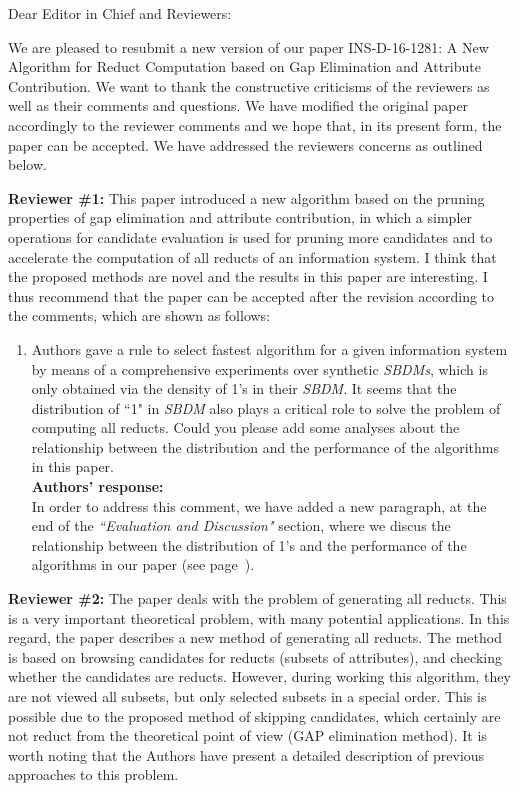 \documentclass{letter}
\begin{document}
\begin{letter}{}
  \opening{Dear Editor in Chief and Reviewers:}

  We are pleased to resubmit a new version of our paper INS-D-16-1281: A New Algorithm for Reduct Computation based on Gap Elimination and Attribute Contribution. We want to thank the constructive criticisms of the reviewers as well as their comments and questions. We have modified the original paper accordingly to the reviewer comments and we hope that, in its present form, the paper can be accepted. We have addressed the reviewers concerns as outlined below.

  \textbf{Reviewer \#1:} 
  This paper introduced a new algorithm based on the pruning properties of gap elimination and attribute contribution, in which a simpler operations for candidate evaluation is used for pruning more candidates and to accelerate the computation of all reducts of an information system. I think that the proposed methods are novel and the results in this paper are interesting. I thus recommend that the paper can be accepted after the revision according to the comments, which are shown as follows:

  \begin{enumerate}
    \item Authors gave a rule to select fastest algorithm for a given information system by means of a comprehensive experiments over synthetic \textit{SBDMs}, which is only obtained via the density of 1's in their \textit{SBDM}. It seems that the distribution of ``1" in \textit{SBDM} also plays a critical role to solve the problem of computing all reducts. Could you please add some analyses about the relationship between the distribution and the performance of the algorithms in this paper.\\
    \textbf{Authors’ response:} \\
    In order to address this comment, we have added a new paragraph, at the end of the \textit{``Evaluation and Discussion"} section, where we discus the relationship between the distribution of 1's and the performance of the algorithms in our paper (see page~\pageref{par:distribution}).
  \end{enumerate}
  
  \textbf{Reviewer \#2:}
  The paper deals with the problem of generating all reducts. This is a very important theoretical problem, with many potential applications. In this regard, the paper describes a new method of generating all reducts. The method is based on browsing candidates for reducts (subsets of attributes), and checking whether the candidates are reducts. However, during working this algorithm, they are not viewed all subsets, but only selected subsets in a special order. This is possible due to the proposed method of skipping candidates, which certainly are not reduct from the theoretical point of view (GAP elimination method).
  It is worth noting that the Authors have present a detailed description of previous approaches to this problem.
  

\end{letter}
\end{document}
